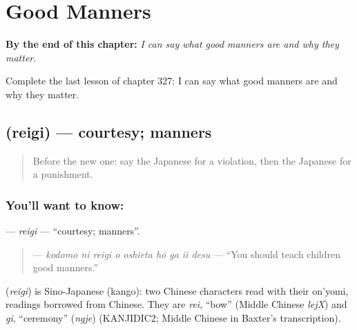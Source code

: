 
\chapter{Good Manners}
\label{ch:ja-good-manners}

\begin{chapteropening}
\textbf{By the end of this chapter:} \emph{I can say what good manners are and why they matter.}

Complete the last lesson of chapter 327: I can say what good manners are and why they matter.
\end{chapteropening}

\section[\texorpdfstring{\ja{れいぎ} (reigi)}{れいぎ (reigi)}]{ (reigi) — courtesy; manners}

\label{lesson:JA-C327-reigi}



\begin{quote}
Before the new one: say the Japanese for a violation, then the Japanese for a punishment.
\end{quote}

\subsection*{You'll want to know: }
\textbf{} — \emph{reigi} — \textquotedblleft{}courtesy; manners\textquotedblright{}.

\begin{quote}
\textbf{    } — \emph{kodomo ni reigi o oshieta hō ga ii desu} — \textquotedblleft{}You should teach children good manners.\textquotedblright{}
\end{quote}

\begin{cousinweb}
\textbf{} (\emph{reigi}) is Sino-Japanese (kango): two Chinese characters read with their on'yomi, readings borrowed from Chinese. They are \emph{rei}, \textquotedblleft{}bow\textquotedblright{} (Middle Chinese \emph{lejX}) and \emph{gi}, \textquotedblleft{}ceremony\textquotedblright{} (\emph{ngje}) (KANJIDIC2; Middle Chinese in Baxter's transcription).
\end{cousinweb}

